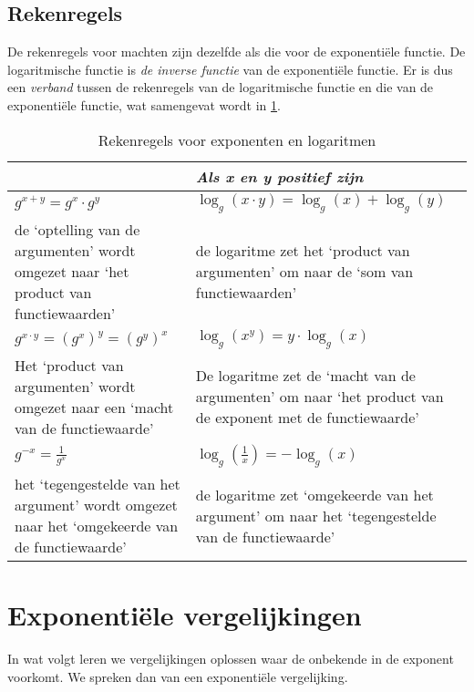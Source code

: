 \subsection{Rekenregels}

De rekenregels voor machten zijn dezelfde als die voor de
exponenti\"{e}le functie. De logaritmische functie is \emph{de inverse functie} van de exponenti\"{e}le
functie. Er is dus een \emph{verband} tussen de
rekenregels van de logaritmische functie en die van de exponenti\"{e}le
functie, wat samengevat wordt in \cref{tbl:logexpverband}. 
\begin{table}[htbp]
    \centering
    \caption{Rekenregels voor exponenten en logaritmen}
       \begin{tabular}{p{5cm}|p{5.5cm}}
    \toprule
     & \emph{Als x en y positief zijn}  \\
    \midrule
    $g^{x+y}=g^{x}\cdot g^{y}$ & $\log_{g}(x\cdot y)=\log_{g}(x)+\log_{g}(y)$  \\  
    de `optelling van de argumenten' wordt omgezet naar `het product
    van functiewaarden' & de logaritme zet het
    `product van argumenten' om naar de  `som van
    functiewaarden'  \\     \midrule
    $g^{x\cdot y}=\left(g^{x}\right)^{y}=\left(g^{y}\right)^{x}$ & $\log_{g}(x^{y})=y\cdot \log_{g}(x)$
    \\  
    Het `product van argumenten' wordt omgezet naar een `macht
    van de functiewaarde' &
    De logaritme zet de ‘macht van de argumenten’ om naar `het
    product van de exponent met de functiewaarde'\\
    \midrule
   
    $g^{-x}=\frac{1}{g^{x}}$ & $\log_{g}\left(\frac{1}{x}\right)=-\log_{g}(x)$\\      %
    het `tegengestelde van het argument' wordt omgezet naar het
    `omgekeerde van de functiewaarde' & de logaritme zet ‘omgekeerde
    van het argument’ om naar  het  `tegengestelde van de
    functiewaarde'  \\
    \bottomrule
\end{tabular}

    \label{tbl:logexpverband}
\end{table}

\newpage
\section{Exponenti\"{e}le vergelijkingen}
\label{sec:exp_vgl}
In wat volgt leren we vergelijkingen oplossen waar  de onbekende
in de exponent voorkomt. We spreken dan van een exponenti\"{e}le
vergelijking. 

